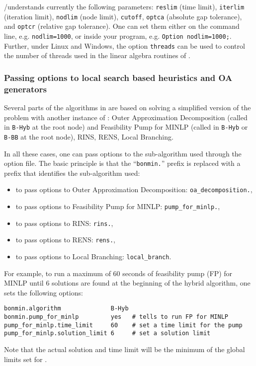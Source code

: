 \GAMS/\BONMIN understands currently the following \GAMS parameters: \texttt{reslim} (time limit), \texttt{iterlim} (iteration limit), \texttt{nodlim} (node limit), \texttt{cutoff}, \texttt{optca} (absolute gap tolerance), and \texttt{optcr} (relative gap tolerance).
One can set them either on the command line, e.g. \verb+nodlim=1000+, or inside your \GAMS program, e.g. \verb+Option nodlim=1000;+.
Further, under Linux and Windows, the option \texttt{threads} can be used to control the number of threads used in the linear algebra routines of \IPOPT.

\subsubsection{Passing options to local search based heuristics and OA generators}
Several parts of the algorithms in \BONMIN are based on solving a simplified version of the problem with another instance of \BONMIN:
Outer Approximation Decomposition (called in {\tt B-Hyb} at the root node)
and Feasibility Pump for MINLP (called in {\tt B-Hyb} or {\tt B-BB} at the root node), RINS, RENS, Local Branching.

In all these cases, one can pass options to the sub-algorithm used through the option file.
The basic principle is that the ``\texttt{bonmin.}'' prefix  is replaced with a prefix that identifies the sub-algorithm used:
\begin{itemize}
\vspace{-2ex}
\setlength{\parskip}{.2ex}
\setlength{\itemsep}{0pt}
\setlength{\partopsep}{0pt}
\item to pass options to Outer Approximation Decomposition: {\tt oa\_decomposition.},
\item to pass options to Feasibility Pump for MINLP: {\tt pump\_for\_minlp.},
\item to pass options to RINS: {\tt rins.},
\item to pass options to RENS: {\tt rens.},
\item to pass options to Local Branching: {\tt local\_branch}.
\end{itemize}

\vspace{-2ex}
For example, to run a maximum of 60 seconds of feasibility pump (FP) for MINLP until 6 solutions are found at the beginning of the hybrid algorithm, one sets the following options:
\begin{verbatim}
bonmin.algorithm              B-Hyb
bonmin.pump_for_minlp         yes   # tells to run FP for MINLP
pump_for_minlp.time_limit     60    # set a time limit for the pump
pump_for_minlp.solution_limit 6     # set a solution limit
\end{verbatim}
Note that the actual solution and time limit will be the minimum of the global limits set for \BONMIN.


